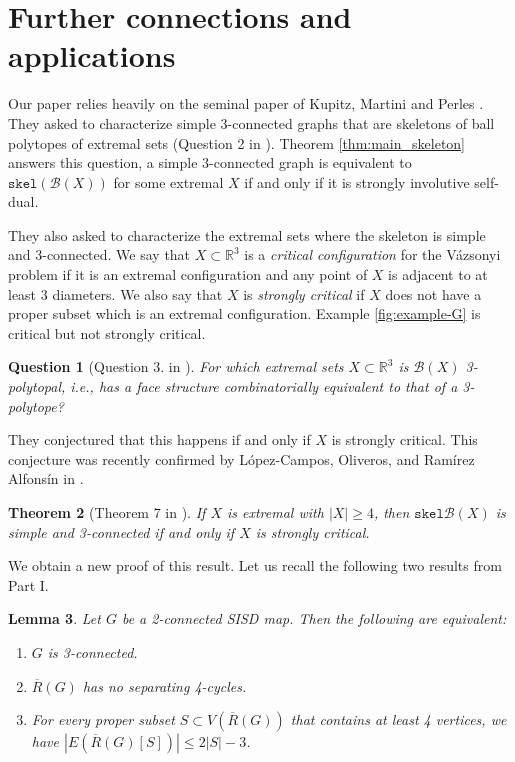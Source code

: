 \documentclass[10pt,a4paper]{article}
\newtheorem{theorem}{Theorem}[section]
\newtheorem{lemma}[theorem]{Lemma}
\newtheorem{question}[theorem]{Question}
\newcounter{example}
\newcommand{\R}[0]{\mathbb{R}}
\newcommand{\Bc}[0]{\mathcal{B}}
\newcommand{\skel}[0]{\mathtt{skel}}
\begin{document}
\section{Further connections and applications}\label{sec:furtherconnections}

Our paper relies heavily on the seminal paper of Kupitz, Martini and Perles \cite{kupitz2010ball}. They asked to characterize  simple 3-connected graphs that are skeletons of ball polytopes of extremal sets (Question 2 in \cite{kupitz2010ball}). Theorem \ref{thm:main_skeleton} answers this question, a simple 3-connected graph is equivalent to $\skel(\Bc(X))$ for some extremal $X$ if and only if it is strongly involutive self-dual.  

They also asked to characterize the extremal sets where the skeleton is simple and 3-connected. We say that $X\subset \R^3$ is a \emph{critical configuration} for the Vázsonyi problem if it is an extremal configuration and any point of $X$ is adjacent to at least 3 diameters. We also say that $X$ is \emph{strongly critical} if $X$ does not have a proper subset which is an extremal configuration. Example \ref{fig:example-G} is critical but not strongly critical.

\begin{question}[Question 3. in \cite{kupitz2010ball}]
     For which extremal sets $X\subset \R^3$ is $\Bc(X)$ 3-polytopal, i.e., has a face structure combinatorially equivalent to that of a 3-polytope?
\end{question}

They conjectured that this happens if and only if $X$ is strongly critical. This conjecture was recently confirmed by López-Campos,  Oliveros, and  Ramírez Alfonsín in \cite{lopez2023borsuk}. 
\begin{theorem}[Theorem 7 in \cite{lopez2023borsuk}]\label{thm:stronglycritical}
    If $X$ is extremal with $|X|\ge 4$, then $\skel\Bc(X)$ is simple and 3-connected if and only if $X$ is strongly critical. 
\end{theorem}
We obtain a new proof of this result. Let us recall the following two results from Part I. 

\begin{lemma}\label{lem:3conequiv}
    Let $G$ be a 2-connected SISD map. Then the following are equivalent:
    \begin{enumerate}
        \item $G$ is 3-connected.
        \item $\overline R(G)$ has no separating 4-cycles.
        \item For every proper subset $S\subset V(\overline R(G))$ that contains at least 4 vertices, we have $|E(\overline R(G)[S])|\le 2|S|-3$.
    \end{enumerate}
    
\end{lemma}
\end{document}
